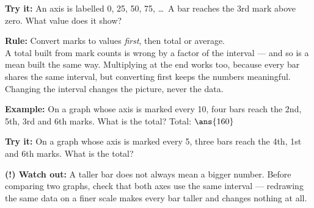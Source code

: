 \documentclass[12pt]{article}
\begin{document}
\begin{tryitbox}
\textbf{Try it:} \quad An axis is labelled 0, 25, 50, 75, \ldots\ A bar reaches the 3rd mark above zero. What value does it show?\\[2pt]
\end{tryitbox}


\begin{formulabox}
\textbf{Rule:} Convert marks to values \emph{first}, then total or average.\\[3pt]
A total built from mark counts is wrong by a factor of the interval --- and so is a mean built the same way. Multiplying at the end works too, because every bar shares the same interval, but converting first keeps the numbers meaningful.\\[3pt]
Changing the interval changes the picture, never the data.
\end{formulabox}

\begin{examplebox}
\textbf{Example:} \quad On a graph whose axis is marked every 10, four bars reach the 2nd, 5th, 3rd and 6th marks. What is the total?
Total: $\ans{160}$
\end{examplebox}

\begin{tryitbox}
\textbf{Try it:} \quad On a graph whose axis is marked every 5, three bars reach the 4th, 1st and 6th marks. What is the total?\\[2pt]
\end{tryitbox}

\begin{watchoutbox}
\textbf{(!) Watch out:} A taller bar does not always mean a bigger number. Before comparing two graphs, check that both axes use the same interval --- redrawing the same data on a finer scale makes every bar taller and changes nothing at all.
\end{watchoutbox}
\end{document}
